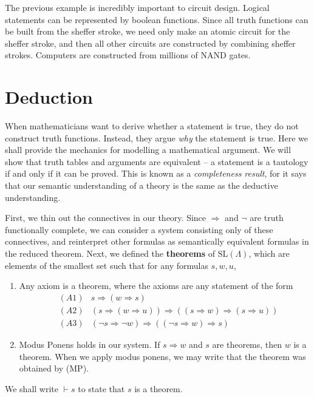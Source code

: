 The previous example is incredibly important to circuit design. Logical statements can be represented by boolean functions. Since all truth functions can be built from the sheffer stroke, we need only make an atomic circuit for the sheffer stroke, and then all other circuits are constructed by combining sheffer strokes. Computers are constructed from millions of NAND gates.




\section{Deduction}

When mathematicians want to derive whether a statement is true, they do not construct truth functions. Instead, they argue {\it why} the statement is true. Here we shall provide the mechanics for modelling a mathematical argument. We will show that truth tables and arguments are equivalent -- a statement is a tautology if and only if it can be proved. This is known as a {\it completeness result}, for it says that our semantic understanding of a theory is the same as the deductive understanding.

First, we thin out the connectives in our theory. Since $\Rightarrow$ and $\neg$ are truth functionally complete, we can consider a system consisting only of these connectives, and reinterpret other formulas as semantically equivalent formulas in the reduced theorem. Next, we defined the {\bf theorems} of $\text{SL}(\Lambda)$, which are elements of the smallest set such that for any formulas $s,w,u$,
    \begin{enumerate}
        \item Any axiom is a theorem, where the axioms are any statement of the form
        \begin{align*}
            &(A1) & s \Rightarrow (w \Rightarrow s)\\
            &(A2) & (s \Rightarrow (w \Rightarrow u)) \Rightarrow ((s \Rightarrow w) \Rightarrow (s \Rightarrow u))\\
            &(A3) & (\neg s \Rightarrow \neg w) \Rightarrow ((\neg s \Rightarrow w) \Rightarrow s)
        \end{align*}
        \item Modus Ponens holds in our system. If $s \Rightarrow w$ and $s$ are theorems, then $w$ is a theorem. When we apply modus ponens, we may write that the theorem was obtained by (MP).
    \end{enumerate}
We shall write $\vdash s$ to state that $s$ is a theorem.

